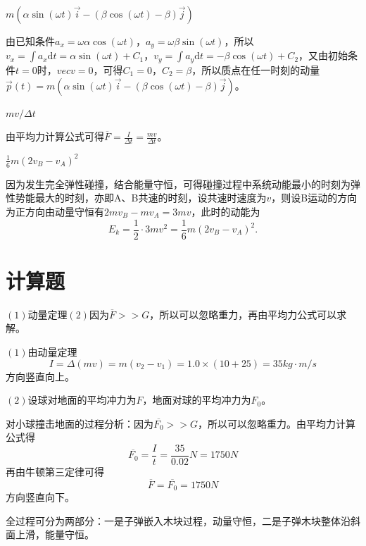 \documentclass[b5paper,opensource,sourcefont,parskip]{qyxf-book}
\newcommand{\di}[1]{\mathrm{d}#1}
\begin{document}
$m(\alpha\sin(\omega t)\vec{i}-(\beta\cos(\omega t)-\beta)\vec{j})$

\solve 由已知条件$a_x=\omega\alpha\cos(\omega t)，a_y=\omega\beta\sin(\omega t)$，所以$v_x=\int a_x\di t=\alpha\sin(\omega t)+C_1$，$v_y=\int a_y\di t=-\beta\cos(\omega t)+C_2$，又由初始条件$t=0$时，$vec{v}=0$，可得$C_1=0$，$C_2=\beta$，所以质点在任一时刻的动量$\vec{p}(t)=m(\alpha\sin(\omega t)\vec{i}-(\beta\cos(\omega t)-\beta)\vec{j})$。
			
$mv/\Delta t$
			
\solve 由平均力计算公式可得$\overline{F}=\frac{I}{\Delta t}=\frac{mv}{\Delta t}$。

$\frac{1}{6}m(2v_B-v_A)^2$
			
\solve 因为发生完全弹性碰撞，结合能量守恒，可得碰撞过程中系统动能最小的时刻为弹性势能最大的时刻，亦即A、B共速的时刻，设共速时速度为$v$，则设B运动的方向为正方向由动量守恒有$2mv_B-mv_A=3mv$，此时的动能为
\begin{equation*}
E_k=\frac{1}{2}\cdot 3mv^2=\frac{1}{6}m(2v_B-v_A)^2.
\end{equation*}

\section{计算题}

\analysis $(1)$动量定理$(2)$因为$\overline{F}>>G$，所以可以忽略重力，再由平均力公式可以求解。

\solve $(1)$由动量定理
\begin{equation*}
I=\Delta(mv)=m(v_2-v_1)=1.0\times(10+25)=35kg\cdot m/s
\end{equation*}
方向竖直向上。

$(2)$设球对地面的平均冲力为$F$，地面对球的平均冲力为$F_0$。

对小球撞击地面的过程分析：因为$\overline{F_0}>>G$，所以可以忽略重力。由平均力计算公式得
\begin{equation*}
\overline{F_0}=\frac{I}{t}=\frac{35}{0.02}N=1750N
\end{equation*}
再由牛顿第三定律可得
\begin{equation*}
\overline{F}=\overline{F_0}=1750N
\end{equation*}
方向竖直向下。


\analysis 全过程可分为两部分：一是子弹嵌入木块过程，动量守恒，二是子弹木块整体沿斜面上滑，能量守恒。
\end{document}
